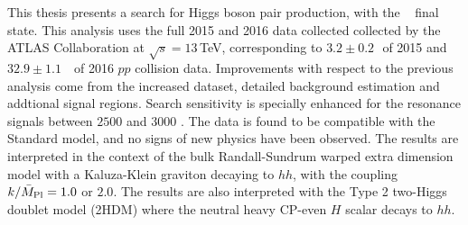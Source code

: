 This thesis presents a search for Higgs boson pair production, with the \bbbb~ final state. 
This analysis uses the full 2015 and 2016 data collected collected by the ATLAS Collaboration at $\sqrt{s}=13$\,TeV, corresponding to $3.2 \pm 0.2$\,\ifb\ of 2015 and $32.9 \pm 1.1$\, \ifb\ of 2016 $pp$ collision data.
Improvements with respect to the previous analysis come from the increased dataset, detailed background estimation and addtional signal regions. 
Search sensitivity is specially enhanced for the resonance signals between $2500$ \GeV and $3000$ \GeV.
The data is found to be compatible with the Standard model, and no signs of new physics have been observed.
The results are interpreted in the context of the bulk Randall-Sundrum warped extra dimension model with a Kaluza-Klein graviton decaying to $hh$, with the coupling $k/\bar{M}_{\rm Pl} = 1.0$ or $2.0$.
The results are also interpreted with the Type 2 two-Higgs doublet model (2HDM) where the neutral heavy CP-even $H$ scalar decays to $hh$.